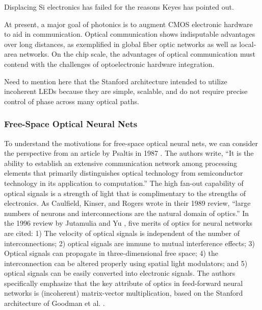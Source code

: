 Displacing Si electronics has failed for the reasons Keyes has pointed out.

At present, a major goal of photonics is to augment CMOS electronic hardware to aid in communication. Optical communication shows indisputable advantages over long distances, as exemplified in global fiber optic networks as well as local-area networks. On the chip scale, the advantages of optical communication must contend with the challenges of optoelectronic hardware integration. 


\vspace{3em}
Need to mention here that the Stanford architecture intended to utilize incoherent LEDs because they are simple, scalable, and do not require precise control of phase across many optical paths.


\subsubsection{Free-Space Optical Neural Nets}
To understand the motivations for free-space optical neural nets, we can consider the perspective from an article by Psaltis in 1987 \cite{abps1987}. The authors write, ``It is the ability to establish an extensive communication network among processing elements that primarily distinguishes optical technology from semiconductor technology in its application to computation.'' The high fan-out capability of optical signals is a strength of light that is complimentary to the strengths of electronics.  As Caulfield, Kinser, and Rogers wrote in their 1989 review, ``large numbers of neurons and interconnections are the natural domain of optics.'' In the 1996 review by Jutamulia and Yu \cite{juyu1996}, five merits of optics for neural networks are cited: 1) The velocity of optical signals is independent of the number of interconnections; 2) optical signals are immune to mutual interference effects; 3) Optical signals can propagate in three-dimensional free space; 4) the interconnection can be altered properly using spatial light modulators; and 5) optical signals can be easily converted into electronic signals. The authors specifically emphasize that the key attribute of optics in feed-forward neural networks is (incoherent) matrix-vector multiplication, based on the Stanford architecture of Goodman et al. \cite{godi1978}. 

